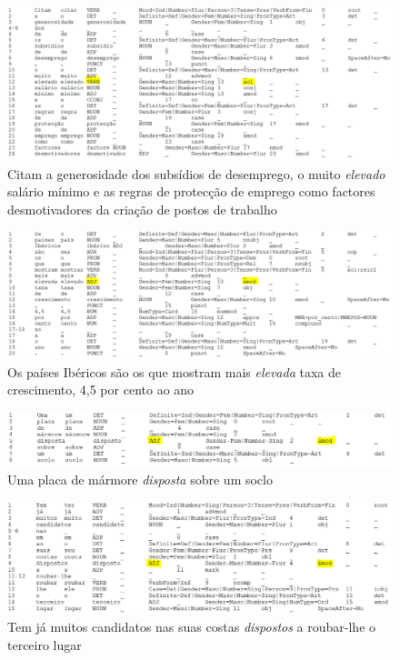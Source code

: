 \documentclass[output=paper,colorlinks,citecolor=brown]{langscibook}
\begin{document}
\begin{enumerate}
		\begin{figure}[H]
			\centering
			\includegraphics[width=\textwidth,height=\textheight,keepaspectratio]{imagesDrive/elevado1.png}
			\caption{Citam a generosidade dos subsídios de desemprego, o muito \emph{elevado} salário mínimo e as regras de protecção de emprego como factores desmotivadores da criação de postos de trabalho}	
			\label{fig:elevado1}
		\end{figure}

		\begin{figure}[H]
			\centering
			\includegraphics[width=\textwidth,height=\textheight,keepaspectratio]{imagesDrive/elevado2.png}
			\caption{Os países Ibéricos são os que mostram mais \emph{elevada} taxa de crescimento, 4,5 por cento ao ano}	
			\label{fig:elevado2}
		\end{figure}

		\begin{figure}[H]
			\centering
			\includegraphics[width=\textwidth,height=\textheight,keepaspectratio]{imagesDrive/disposto1.png}
			\caption{Uma placa de mármore \emph{disposta} sobre um soclo}	
			\label{fig:disposto1}
		\end{figure}

		\begin{figure}[H]
			\centering
			\includegraphics[width=\textwidth,height=\textheight,keepaspectratio]{imagesDrive/disposto2.png}
			\caption{Tem já muitos candidatos nas suas costas \emph{dispostos} a roubar-lhe o terceiro lugar}	
			\label{fig:disposto2}
		\end{figure}


\end{enumerate}
\end{document}
